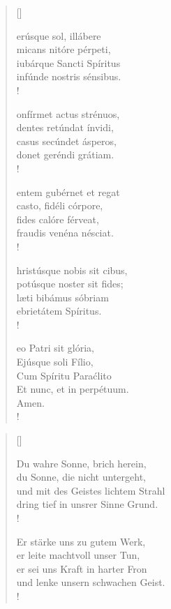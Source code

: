 \begin{multicols}{2}
\begin{verse}[\versewidth]

{\small{erúsque sol, illábere\\
micans nitóre pérpeti, \\
iubárque Sancti Spíritus\\
infúnde nostris sénsibus.\\!

onfírmet actus strénuos, \\
dentes retúndat ínvidi,\\
casus secúndet ásperos, \\
donet geréndi grátiam.\\!

entem gubérnet et regat\\
casto, fidéli córpore,\\
fides calóre férveat, \\
fraudis venéna nésciat.\\!

hristúsque nobis sit cibus, \\
potúsque noster sit fides;\\
læti bibámus sóbriam\\
ebrietátem Spíritus.\\!

eo Patri sit glória,\\
Ejúsque soli Fílio,\\
Cum Spíritu Paraćlito\\
Et nunc, et in perpétuum.\\
Amen.\\!}}

\end{verse}

\columnbreak

\begin{verse}[\versewidth]

{\small\rm{ Du wahre Sonne, brich herein,\\
du Sonne, die nicht untergeht,\\
und mit des Geistes lichtem Strahl\\
dring tief in unsrer Sinne Grund.\\!

 Er stärke uns zu gutem Werk,\\
er leite machtvoll unser Tun,\\
er sei uns Kraft in harter Fron\\
und lenke unsern schwachen Geist.\\!

}}
\end{verse}
\end{multicols}
